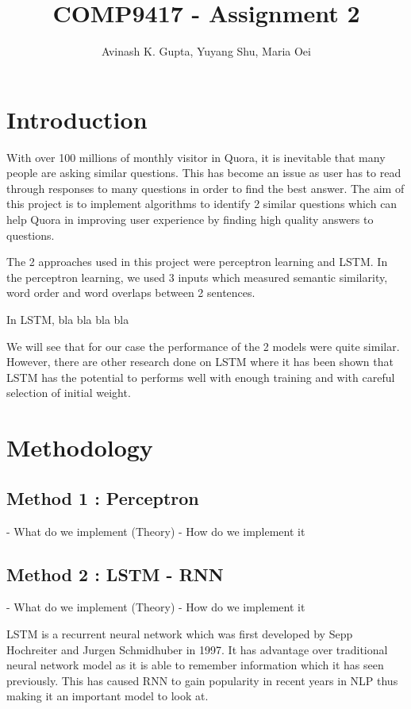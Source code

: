 \documentclass[11pt, oneside]{article}   	%
\title{COMP9417 - Assignment 2}
\author{Avinash K. Gupta, Yuyang Shu, Maria Oei}
\begin{document}
\maketitle


\section{Introduction}

With over 100 millions of monthly visitor in Quora, it is inevitable that many people are asking similar questions. This has become an issue as user has to read through responses to many questions in order to find the best answer. The aim of this project is to implement algorithms to identify 2 similar questions which can help Quora in improving user experience by finding high quality answers to questions.

The 2 approaches used in this project were perceptron learning and LSTM. In the perceptron learning, we used 3 inputs which measured semantic similarity, word order and word overlaps between 2 sentences.

In LSTM, bla bla bla bla

We will see that for our case the performance of the 2 models were quite similar. However, there are other research done on LSTM where it has been shown that LSTM has the potential to performs well with enough training and with careful selection of initial weight.

\section{Methodology}

\subsection{Method 1 : Perceptron}
- What do we implement (Theory)
- How do we implement it

\subsection{Method 2 : LSTM - RNN}
- What do we implement (Theory)
- How do we implement it

LSTM is a recurrent neural network which was first developed by Sepp Hochreiter and Jurgen Schmidhuber in 1997. It has advantage over traditional neural network model as it is able to remember information which it has seen previously. This has caused RNN to gain popularity in recent years in NLP thus making it an important model to look at.
\end{document}
